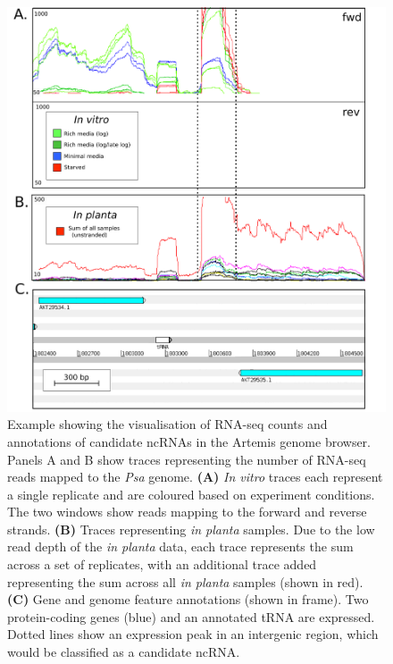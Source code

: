 \begin{figure}[H]
    \centering
    \includegraphics[scale=1]{psa/psa_ncRNA/peak_example.png}
    \caption[Example showing the visualisation of RNA-seq counts and candidate ncRNA annotation in the Artemis genome browser]{Example showing the visualisation of RNA-seq counts and annotations of candidate ncRNAs in the Artemis genome browser. Panels A and B show traces representing the number of RNA-seq reads mapped to the \textit{Psa} genome. \textbf{(A)} \textit{In vitro} traces each represent a single replicate and are coloured based on experiment conditions. The two windows show reads mapping to the forward and reverse strands. \textbf{(B)} Traces representing \textit{in planta} samples. Due to the low read depth of the \textit{in planta} data, each trace represents the sum across a set of replicates, with an additional trace added representing the sum across all \textit{in planta} samples (shown in red). \textbf{(C)} Gene and genome feature annotations (shown in frame). Two protein-coding genes (blue) and an annotated tRNA are expressed. Dotted lines show an expression peak in an intergenic region, which would be classified as a candidate ncRNA.}
    \label{fig:peak_example}
\end{figure}

